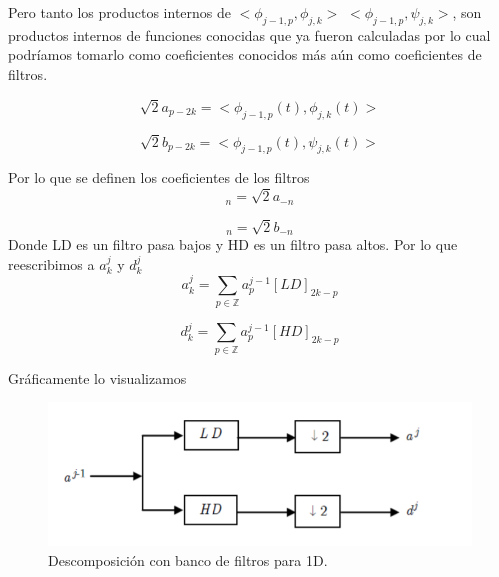 \documentclass{beamer}
\begin{document}
  \begin{frame}
  Pero tanto los productos internos de $<\phi_{j-1,p},\phi_{j,k}>$ $<\phi_{j-1,p},\psi_{j,k}>$, son productos internos de funciones conocidas que ya fueron calculadas por lo cual podríamos tomarlo como coeficientes conocidos más aún como coeficientes de filtros.
  
\begin{equation}
	\sqrt{2} a_{p-2k}=<\phi _{j-1,p}(t),\phi _{j,k}(t)>
\end{equation}
	
\begin{equation}
	\sqrt{2} b_{p-2k}=<\phi _{j-1,p}(t),\psi _{j,k}(t)>
\end{equation}
  
  \end{frame}
\begin{frame}
Por lo que se definen los coeficientes de los filtros 
\begin{equation}
[LD]_{n}=\sqrt{2}  a_{-n}
\end{equation}

\begin{equation}
[HD]_{n}=\sqrt{2}  b_{-n}
\end{equation}
Donde LD es un filtro pasa bajos y HD es un filtro pasa altos.
Por lo que reescribimos a $a^{j}_k$ y $d^{j}_k$
\begin{equation}
\label{afinal}
a^{j}_{k}=\sum_{p \in \mathbb Z} a^{j-1}_{p} [LD]_{2k-p}
\end{equation}

\begin{equation}
\label{dfinal}
d^{j}_{k}=\sum_{p \in \mathbb Z} a^{j-1}_{p} [HD]_{2k-p}
\end{equation}

\end{frame}
\begin{frame}
Gráficamente lo visualizamos

\begin{figure}[htb]
	\centering
	\includegraphics[width=.75\textwidth]{imgs/bancofiltros1D}
	\caption{Descomposición con banco de filtros para 1D.}
	\label{bancofiltros1D}
\end{figure}
\end{frame}
\end{document}
